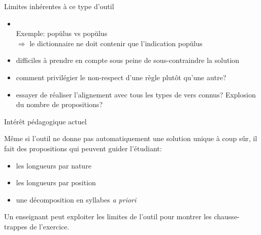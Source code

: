 \documentclass{beamer}
\newcommand\overtxt[2]{\makebox[0cm][l]{\color{diacrit}#1}#2}
\newcommand\hlbr{\overtxt{\u~}}
\newcommand\hllg{\overtxt{\=~}}
\begin{document}
\begin{frame}{Limites inhérentes à ce type d'outil}

\begin{itemize}
\item {}\\
Exemple: p\hlbr{o}p\u{u}lus vs p\hllg{o}p\u{u}lus \\
$\Rightarrow$ le dictionnaire ne doit contenir que l'indication pop\u{u}lus

\vfill

\item {} difficiles à prendre en compte sous peine de sous-contraindre la solution

\vfill

\item {} comment privilégier le non-respect d'une règle plutôt qu'une autre?

\vfill

\item {} essayer de réaliser l'alignement avec tous les types de vers connus? Explosion du nombre de propositions?

\end{itemize}
\end{frame} %




\begin{frame}{Intérêt pédagogique actuel}

Même si l'outil ne donne pas automatiquement une solution unique à coup sûr, il fait des propositions qui peuvent guider l'étudiant:

\begin{itemize}
\item les longueurs par nature
\item les longueurs par position
\item une décomposition en syllabes \emph{a priori}
\end{itemize}

\vfill

Un enseignant peut exploiter les limites de l'outil pour montrer les chausse-trappes de l'exercice.

\end{frame} %
\end{document}
